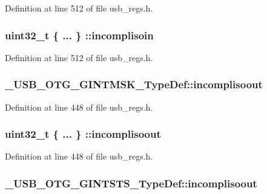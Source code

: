 Definition at line 512 of file usb\-\_\-regs.\-h.

\hypertarget{group___u_s_b___o_t_g___d_r_i_v_e_r_gafa27fdefdbe97d6f66df9d733ea4f626}{
\subsubsection[{incomplisoin}]{\setlength{\rightskip}{0pt plus 5cm}uint32\-\_\-t \{ ... \} \-::incomplisoin}}\label{group___u_s_b___o_t_g___d_r_i_v_e_r_gafa27fdefdbe97d6f66df9d733ea4f626}


Definition at line 512 of file usb\-\_\-regs.\-h.

\hypertarget{group___u_s_b___o_t_g___d_r_i_v_e_r_gaf418f00c9ff43efe4bbe8a39deee4f23}{
\subsubsection[{incomplisoout}]{ \-\_\-\-U\-S\-B\-\_\-\-O\-T\-G\-\_\-\-G\-I\-N\-T\-M\-S\-K\-\_\-\-Type\-Def\-::incomplisoout}}\label{group___u_s_b___o_t_g___d_r_i_v_e_r_gaf418f00c9ff43efe4bbe8a39deee4f23}


Definition at line 448 of file usb\-\_\-regs.\-h.

\hypertarget{group___u_s_b___o_t_g___d_r_i_v_e_r_ga73fe9dca1d5a204d13698d4339e7c021}{
\subsubsection[{incomplisoout}]{\setlength{\rightskip}{0pt plus 5cm}uint32\-\_\-t \{ ... \} \-::incomplisoout}}\label{group___u_s_b___o_t_g___d_r_i_v_e_r_ga73fe9dca1d5a204d13698d4339e7c021}


Definition at line 448 of file usb\-\_\-regs.\-h.

\hypertarget{group___u_s_b___o_t_g___d_r_i_v_e_r_gae03f82d550153902ee9e64cfdaa0544c}{
\subsubsection[{incomplisoout}]{ \-\_\-\-U\-S\-B\-\_\-\-O\-T\-G\-\_\-\-G\-I\-N\-T\-S\-T\-S\-\_\-\-Type\-Def\-::incomplisoout}}\label{group___u_s_b___o_t_g___d_r_i_v_e_r_gae03f82d550153902ee9e64cfdaa0544c}


